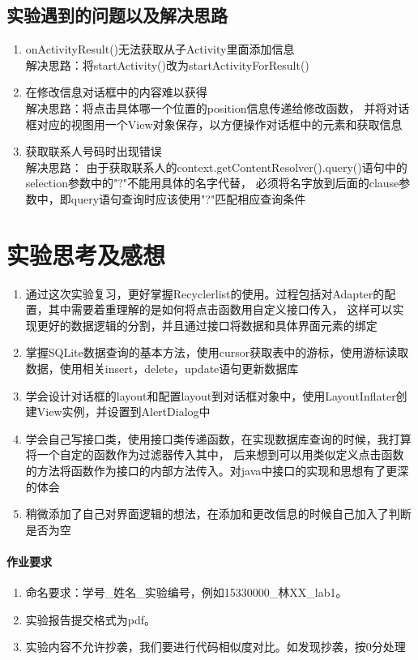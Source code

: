 \documentclass[UTF8]{ctexart}
\begin{document}
	
	\subsection{实验遇到的问题以及解决思路}
	\begin{enumerate}
		\item onActivityResult()无法获取从子Activity里面添加信息\\解决思路：将startActivity()改为startActivityForResult()
		\item 在修改信息对话框中的内容难以获得\\解决思路：将点击具体哪一个位置的position信息传递给修改函数，
		并将对话框对应的视图用一个View对象保存，以方便操作对话框中的元素和获取信息
		\item 获取联系人号码时出现错误\\解决思路：
		由于获取联系人的context.getContentResolver().query()语句中的selection参数中的"?"不能用具体的名字代替，
		必须将名字放到后面的clause参数中，即query语句查询时应该使用"?"匹配相应查询条件
	\end{enumerate}
	
	
\section{实验思考及感想}
\begin{enumerate}
        	\item 通过这次实验复习，更好掌握Recyclerlist的使用。过程包括对Adapter的配置，其中需要着重理解的是如何将点击函数用自定义接口传入，
	这样可以实现更好的数据逻辑的分割，并且通过接口将数据和具体界面元素的绑定
	\item 掌握SQLite数据查询的基本方法，使用cursor获取表中的游标，使用游标读取数据，使用相关insert，delete，update语句更新数据库
	\item 学会设计对话框的layout和配置layout到对话框对象中，使用LayoutInflater创建View实例，并设置到AlertDialog中
	\item 学会自己写接口类，使用接口类传递函数，在实现数据库查询的时候，我打算将一个自定的函数作为过滤器传入其中，
	后来想到可以用类似定义点击函数的方法将函数作为接口的内部方法传入。对java中接口的实现和思想有了更深的体会
	\item 稍微添加了自己对界面逻辑的想法，在添加和更改信息的时候自己加入了判断是否为空
\end{enumerate}

	
	
\paragraph{作业要求}
\begin{enumerate}
\item 命名要求：学号\_姓名\_实验编号，例如15330000\_林XX\_lab1。
\item 实验报告提交格式为pdf。 
\item 实验内容不允许抄袭，我们要进行代码相似度对比。如发现抄袭，按0分处理 
\end{enumerate}
\end{document}
